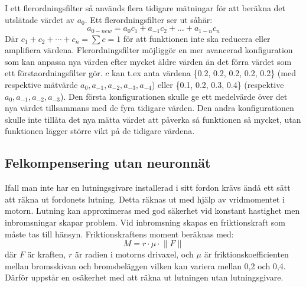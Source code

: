 I ett flerordningsfilter så används flera tidigare mätningar för att
beräkna det utslätade värdet av $a_{0}$. Ett flerordningsfilter ser ut såhär:
\begin{equation}
	a_{0-new} = a_{0}c_{1} + a_{-1}c_{2} + … + a_{1-n}c_{n}
\end{equation}
Där $ c_1 + c_2 + \dotsb + c_n = \sum c = 1 $ för att funktionen
inte ska reducera eller amplifiera värdena.
Flerordningsfilter möjliggör en mer avancerad konfiguration som kan anpassa
nya värden efter mycket äldre värden än det förra värdet som ett
förstaordningsfilter gör.
$c$ kan t.ex anta värdena \{0.2, 0.2, 0.2, 0.2, 0.2\} (med respektive mätvärde
$a_0, a_{-1}, a_{-2}, a_{-3}, a_{-4}$) eller \{0.1, 0.2, 0.3, 0.4\}
(respektive $ a_0, a_{-1}, a_{-2}, a_{-3}$).
Den första konfigurationen skulle ge ett medelvärde över det nya värdet
tillsammans med de fyra tidigare värden. Den andra konfigurationen skulle
inte tillåta det nya mätta värdet att påverka så funktionen så mycket,
utan funktionen lägger större vikt på de tidigare värdena.

\subsection{Felkompensering utan neuronnät}
Ifall man inte har en lutningsgivare installerad i sitt fordon krävs ändå ett
sätt att räkna ut fordonets lutning.
Detta räknas ut med hjälp av vridmomentet i motorn.
Lutning kan approximeras med god säkerhet vid konstant hastighet men inbromsningar
skapar problem.
Vid inbromsning skapas en friktionskraft som måste tas till hänsyn.
Friktionskraftens moment beräknas med:
\begin{equation}
	M = r \cdot \mu \cdot \lVert F \rVert
\end{equation}
där $F$ är kraften, $r$ är radien i motorns drivaxel, och $\mu$ är friktionskoefficienten
mellan bromsskivan och bromsbeläggen vilken kan variera mellan 0,2 och 0,4.
Därför uppstår en osäkerhet med att räkna ut lutningen utan lutningsgivare.
\autocite{lauri17}


